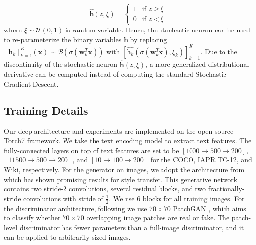 \documentclass[10pt,journal,twocolumn]{IEEEtran}
\begin{document}
\begin{equation}\label{eq:stochastic-neuron}
\hat{\boldsymbol h}(z,\xi) = \begin{cases} 1  & \mbox{if } z \geq \xi \\
0 & \mbox{if } z < \xi \end{cases}
\end{equation}
where $\xi \sim \mathcal{U}(0,1)$ is random variable. Hence, the stochastic neuron can be used to re-parameterize the binary variables $\boldsymbol h$ by replacing $[\boldsymbol h_k]_{k=1}^K (\boldsymbol x) \sim \mathcal{B}(\sigma (\boldsymbol w_k^T \boldsymbol x))$ with $[\hat{\boldsymbol h_k} (\sigma (\boldsymbol w_k^T \boldsymbol x), \xi_k)]_{k=1}^K$. Due to the discontinuity of the stochastic neuron $\hat{\boldsymbol h} (z,\xi)$, a more generalized distributional derivative \cite{Grubb-2008} can be computed instead of computing the standard Stochastic Gradient Descent.



\subsection{Training Details}

Our deep architecture and experiments are implemented on the open-source Torch7 framework. We take the text encoding model \cite{Generate-txt-img} to extract text features. The fully-connected layers on top of text features are set to be $[1000\rightarrow 500 \rightarrow 200]$, $[11500\rightarrow 500 \rightarrow 200]$, and $[10 \rightarrow 100\rightarrow 200]$ for the COCO, IAPR TC-12, and Wiki, respectively. For the generator on images, we adopt the architecture from \cite{Style-transfer} which has shown promising results for style transfer. This generative network contains two stride-2 convolutions, several residual blocks, and two fractionally-stride convolutions with stride of $\frac{1}{2}$. We use 6 blocks for all training images. For the discriminator architecture, following \cite{CycleGAN} we use $70\times 70$ PatchGAN \cite{PatchGAN}, which aims to classify whether $70\times 70$ overlapping image patches are real or fake. The patch-level discriminator has fewer parameters than a full-image discriminator, and it can be applied to arbitrarily-sized images.
\end{document}
